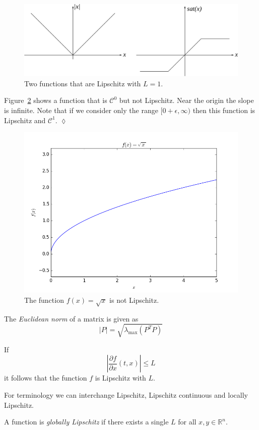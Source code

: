 \begin{figure}[ht!]
\centering
\includegraphics[width=.7\textwidth]{images/05lip}
\caption{Two functions that are Lipschitz with $L=1$.}
\label{fig:05lip}
\end{figure}

\begin{example}
Figure~\ref{fig:05notlip} shows a function that is $\mathcal{C}^0$ but not Lipschitz. Near the origin the slope is infinite. Note that if we consider only the range $[0+\epsilon,\infty)$ then this function is Lipschitz and $\mathcal{C}^1$.%
$\lozenge$
\end{example}

\begin{figure}[ht!]
\centering
\includegraphics[width=.5\textwidth]{images/plotSqrtX}
\caption{The function $f(x) = \sqrt{x}$ is not Lipschitz.}
\label{fig:05notlip}
\end{figure}

\begin{definition}
The \textit{Euclidean norm} of a matrix is given as
$$|P| = \sqrt{\lambda_{\text{max}}(P^T P)}$$
\end{definition}

\begin{lemma}
If
$$\left|\frac{\partial f}{\partial x}(t,x)\right| \leq L$$
it follows that the function $f$ is Lipschitz with $L$.
\end{lemma}
For terminology we can interchange Lipschitz, Lipschitz continuous and locally Lipschitz.

\begin{definition}
A function is \textit{globally Lipschitz} if there exists a single $L$ for all $x,y\in\mathbb{R}^n$.
\end{definition}

